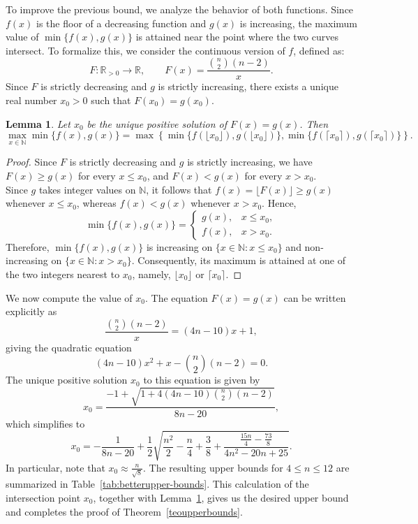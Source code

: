 \documentclass{article}
\newtheorem{lemma}[theorem]{Lemma}
\begin{document}
To improve the previous bound, we analyze the behavior of both functions. 
Since $f(x)$ is the floor of a decreasing function and $g(x)$ is increasing, 
the maximum value of $\min\{f(x),g(x)\}$ is attained near the point where 
the two curves intersect. To formalize this, we consider the continuous 
version of $f$, defined as:
$$
F:\mathbb R_{>0}\to\mathbb R,\qquad
F(x)=\frac{\binom n2(n-2)}{x}.
$$
Since $F$ is strictly decreasing and $g$ is strictly increasing, there exists a unique real number $x_0>0$ such that
$F(x_0)=g(x_0)$.
\begin{lemma}\label{lem:op}
Let $x_0$ be the unique positive solution of
$F(x)=g(x)$.
Then
$$
\max_{x\in\mathbb N}\min\{f(x),g(x)\}
=
\max\left\{
\min\{f(\lfloor x_0\rfloor),g(\lfloor x_0\rfloor)\},
\min\{f(\lceil x_0\rceil),g(\lceil x_0\rceil)\}
\right\}.
$$
\end{lemma}
\begin{proof}
Since $F$ is strictly decreasing and $g$ is strictly increasing, we have
$F(x)\ge g(x)$ for every $x\le x_0$, and
$F(x)<g(x)$ for every $x>x_0$.\\
Since $g$ takes integer values on $\mathbb N$, it follows that
$f(x)=\lfloor F(x)\rfloor\ge g(x)$ whenever $x\le x_0$, whereas
$f(x)<g(x)$ whenever $x>x_0$. Hence,
$$
\min\{f(x),g(x)\}=
\begin{cases}
g(x), & x\le x_0,\\
f(x), & x>x_0.
\end{cases}
$$
Therefore, $\min\{f(x),g(x)\}$ is increasing on
$\{x\in\mathbb N:x\le x_0\}$ and non-increasing on
$\{x\in\mathbb N:x>x_0\}$. Consequently, its maximum is attained at one of the two integers nearest to $x_0$, namely, $\lfloor x_0\rfloor$ or $\lceil x_0\rceil$.
\end{proof}

We now compute the value of $x_0$. The equation $F(x) = g(x)$ can be written explicitly as
$$
\frac{\binom{n}{2}(n-2)}{x} = (4n-10)x+1,
$$
giving the quadratic equation
$$
(4n-10)x^2+x-\binom{n}{2}(n-2)=0.
$$
The unique positive solution $x_0$ to this equation is given by
\begin{equation}
\label{x0}
x_0 = \frac{-1+\sqrt{1+4(4n-10)\binom{n}{2}(n-2)}}{8n-20},
\end{equation}
which simplifies to
\begin{equation}
\label{x0_simplified}
x_0 =- \frac{1}{8n-20} + \frac12 \sqrt{\frac{n^2}{2} -\frac n4 +\frac38 + \frac{\frac{15n}{4}-\frac{73}{8}}{4n^2-20n+25}}.
\end{equation}
In particular, note that $x_0 \approx \frac{n}{\sqrt{8}}$. The resulting upper bounds for $4 \leq n \leq 12$ are summarized in Table~\ref{tab:betterupper-bounds}.  This calculation of the 
intersection point $x_0$, together with Lemma~\ref{lem:op}, gives us 
the desired upper bound and completes the proof of Theorem~\ref{teoupperbounds}.
\end{document}
